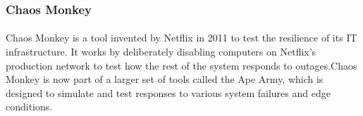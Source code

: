 \documentclass{article}
\begin{document}
\subsubsection{Chaos Monkey}\vspace{16pt}
\paragraph{}\vspace{11pt}\justifying
Chaos Monkey is a tool invented by Netflix in 2011 to test the resilience of its IT infrastructure. It works by deliberately disabling computers on Netflix's production network to test how the rest of the system responds to outages.Chaos Monkey is now part of a larger set of tools called the Ape Army, which is designed to simulate and test responses to various system failures and edge conditions.\\

\newpage


\end{document}
